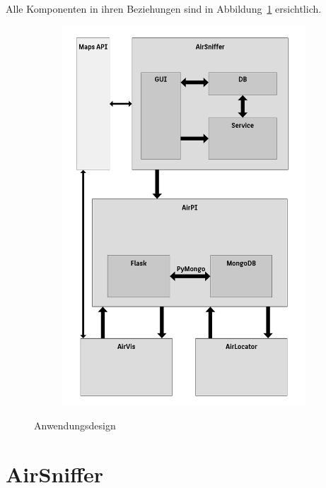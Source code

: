 \documentclass[11pt,a4paper]{article}
\begin{document}
Alle Komponenten in ihren Beziehungen sind in Abbildung~\ref{fig:Anwendungsdesign} ersichtlich.

\begin{figure}[htbp]
    \centering
    \begin{subfigure}[b]{1\textwidth}
        \includegraphics[width=\textwidth]{pics/AirAndwenungsdesign.png}
    \end{subfigure}
    \caption{Anwendungsdesign}\label{fig:Anwendungsdesign}
\end{figure}

\newpage
\section{AirSniffer}
\end{document}
